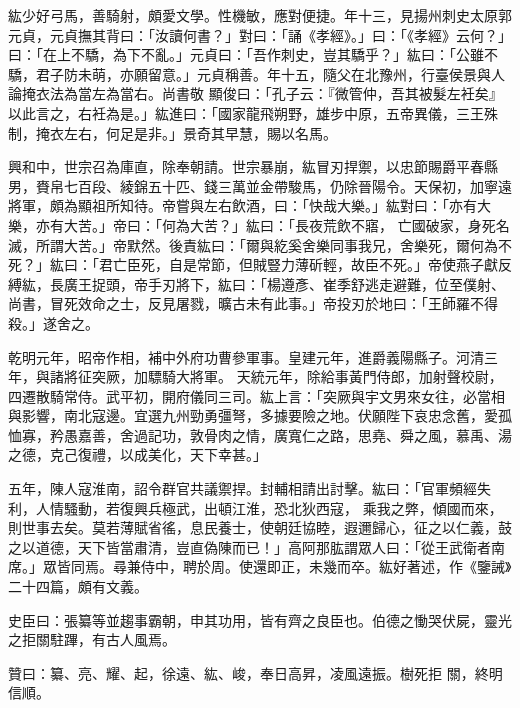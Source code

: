 \begin{pinyinscope}
 紘少好弓馬，善騎射，頗愛文學。性機敏，應對便捷。年十三，見揚州刺史太原郭元貞，元貞撫其背曰：「汝讀何書？」對曰：「誦《孝經》。」曰：「《孝經》云何？」曰：「在上不驕，為下不亂。」元貞曰：「吾作刺史，豈其驕乎？」紘曰：「公雖不驕，君子防未萌，亦願留意。」元貞稱善。年十五，隨父在北豫州，行臺侯景與人論掩衣法為當左為當右。尚書敬
 顯俊曰：「孔子云：『微管仲，吾其被髮左衽矣』以此言之，右衽為是。」紘進曰：「國家龍飛朔野，雄步中原，五帝異儀，三王殊制，掩衣左右，何足是非。」景奇其早慧，賜以名馬。



 興和中，世宗召為庫直，除奉朝請。世宗暴崩，紘冒刃捍禦，以忠節賜爵平春縣男，賚帛七百段、綾錦五十匹、錢三萬並金帶駿馬，仍除晉陽令。天保初，加寧遠將軍，頗為顯祖所知待。帝嘗與左右飲酒，曰：「快哉大樂。」紘對曰：「亦有大樂，亦有大苦。」帝曰：「何為大苦？」紘曰：「長夜荒飲不寤，
 亡國破家，身死名滅，所謂大苦。」帝默然。後責紘曰：「爾與紇奚舍樂同事我兄，舍樂死，爾何為不死？」紘曰：「君亡臣死，自是常節，但賊豎力薄斫輕，故臣不死。」帝使燕子獻反縛紘，長廣王捉頭，帝手刃將下，紘曰：「楊遵彥、崔季舒逃走避難，位至僕射、尚書，冒死效命之士，反見屠戮，曠古未有此事。」帝投刃於地曰：「王師羅不得殺。」遂舍之。



 乾明元年，昭帝作相，補中外府功曹參軍事。皇建元年，進爵義陽縣子。河清三年，與諸將征突厥，加驃騎大將軍。
 天統元年，除給事黃門侍郎，加射聲校尉，四遷散騎常侍。武平初，開府儀同三司。紘上言：「突厥與宇文男來女往，必當相與影響，南北寇邊。宜選九州勁勇彊弩，多據要險之地。伏願陛下哀忠念舊，愛孤恤寡，矜愚嘉善，舍過記功，敦骨肉之情，廣寬仁之路，思堯、舜之風，慕禹、湯之德，克己復禮，以成美化，天下幸甚。」



 五年，陳人寇淮南，詔令群官共議禦捍。封輔相請出討擊。紘曰：「官軍頻經失利，人情騷動，若復興兵極武，出頓江淮，恐北狄西寇，
 乘我之弊，傾國而來，則世事去矣。莫若薄賦省徭，息民養士，使朝廷協睦，遐邇歸心，征之以仁義，鼓之以道德，天下皆當肅清，豈直偽陳而已！」高阿那肱謂眾人曰：「從王武衛者南席。」眾皆同焉。尋兼侍中，聘於周。使還即正，未幾而卒。紘好著述，作《鑒誡》二十四篇，頗有文義。



 史臣曰：張纂等並趨事霸朝，申其功用，皆有齊之良臣也。伯德之慟哭伏屍，靈光之拒關駐蹕，有古人風焉。



 贊曰：纂、亮、耀、起，徐遠、紘、峻，奉日高昇，凌風遠振。樹死拒
 關，終明信順。



\end{pinyinscope}